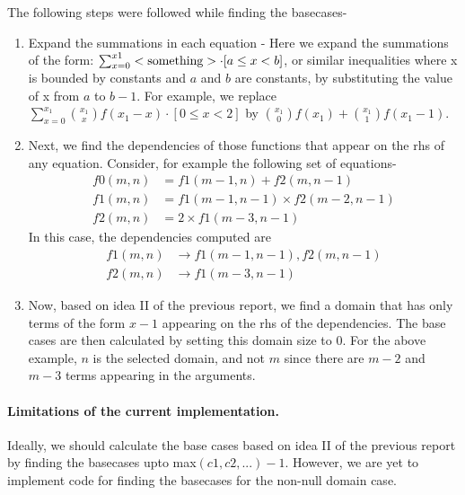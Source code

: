 \documentclass{article}
\begin{document}
The following steps were followed while finding the basecases-
\begin{enumerate}
  \item Expand the summations in each equation - Here we expand the summations
        of the form:
        $\sum_{x=0}^{x1}<\textnormal{something}> \cdot [a \le x < b]$, or
        similar inequalities where x is bounded by constants and $a$ and $b$ are
        constants, by substituting the value of x from $a$ to $b-1$. For
        example, we replace
        $\sum_{x=0}^{x_1} {{x_1}\choose{x}} f(x_1-x)\cdot[0 \le x < 2]$ by
        ${{x_1}\choose{0}}f(x_1) + {{x_1}\choose{1}}f(x_1-1)$.
  \item Next, we find the dependencies of those functions that appear on the rhs
        of any equation. Consider, for example the following set of equations-
        \begin{align}
          f0(m, n) &= f1(m-1, n) + f2(m, n-1)\\
          f1(m, n) &= f1(m-1, n-1) \times f2(m-2, n-1)\\
          f2(m, n) &= 2 \times f1(m-3, n-1)
        \end{align}
        In this case, the dependencies computed are
        \begin{align*}
          f1(m, n) &\rightarrow f1(m-1, n-1), f2(m, n-1)\\
          f2(m, n) &\rightarrow f1(m-3, n-1)
        \end{align*}
  \item Now, based on idea II of the previous report, we find a domain that has
        only terms of the form $x-1$ appearing on the rhs of the dependencies.
        The base cases are then calculated by setting this domain size to 0. For
        the above example, $n$ is the selected domain, and not $m$ since there
        are $m-2$ and $m-3$ terms appearing in the arguments.
\end{enumerate}

\paragraph{Limitations of the current implementation.} Ideally, we should
calculate the base cases based on idea II of the previous report by finding the
basecases upto max$(c1, c2, ...) - 1$. However, we are yet to implement code for
finding the basecases for the non-null domain case.



\end{document}

